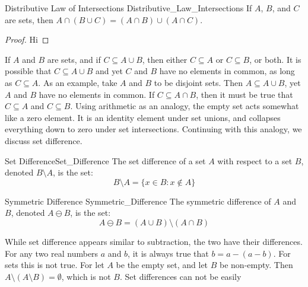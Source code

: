         \begin{ltheorem}{Distributive Law of Intersections}
            {Distributive_Law_Intersections}
            If $A$, $B$, and $C$ are sets, then
            $A\cap(B\cup{C})=(A\cap{B})\cup(A\cap{C})$.
        \end{ltheorem}
        \begin{proof}
            Hi
        \end{proof}
        If $A$ and $B$ are sets, and if
        $C\subseteq{A}\cup{B}$, then
        either $C\subseteq{A}$ or $C\subseteq{B}$, or both.
        It is possible that $C\subseteq{A}\cup{B}$ and yet
        $C$ and $B$ have no elements in common, as long
        as $C\subseteq{A}$. As an example,
        take $A$ and $B$ to be disjoint sets. Then
        $A\subseteq{A}\cup{B}$, yet $A$ and $B$ have no
        elements in common. If $C\subseteq{A}\cap{B}$, then
        it must be true that $C\subseteq{A}$ and
        $C\subseteq{B}$.
        Using arithmetic as an analogy, the empty set
        acts somewhat like a zero element. It is an identity
        element under set unions, and collapses everything
        down to zero under set intersections. Continuing
        with this analogy, we discuss set difference.
        \begin{ldefinition}{Set Difference}{Set_Difference}
            The set difference of a set $A$ with respect to
            a set $B$, denoted $B\setminus{A}$, is the set:
            \begin{equation}
                B\setminus{A}=\{x\in{B}:x\notin{A}\}
            \end{equation}
        \end{ldefinition}
        \begin{ldefinition}{Symmetric Difference}
            {Symmetric_Difference}
            The symmetric difference of $A$ and $B$, denoted
            $A\ominus{B}$, is the set:
            \begin{equation}
                A\ominus{B}
                =(A\cup{B})\setminus(A\cap{B})
            \end{equation}
        \end{ldefinition}
        While set difference appears similar to subtraction,
        the two have their differences. For any two real
        numbers $a$ and $b$, it is always true that
        $b=a-(a-b)$. For sets this is not true. For let $A$
        be the empty set, and let $B$ be non-empty.
        Then $A\setminus(A\setminus{B})=\emptyset$, which
        is not $B$. Set differences can not be easily
